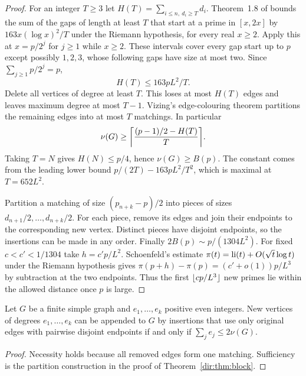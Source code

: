 \begin{proof}
For an integer $T\ge3$ let $H(T)=\sum_{i\le n,\ d_i\ge T}d_i$. Theorem~1.8 of
\cite{ErdosEtAl2024Sequence} bounds the sum of the gaps of length at least $T$ that
start at a prime in $[x,2x]$ by $163x(\log x)^2/T$ under the Riemann hypothesis, for
every real $x\ge2$. Apply this at $x=p/2^j$ for $j\ge1$ while $x\ge2$. These intervals
cover every gap start up to $p$ except possibly $1,2,3$, whose following gaps have size
at most two. Since $\sum_{j\ge1}p/2^j=p$,
\begin{equation}\label{dir:eq:g1}
 H(T)\le163pL^2/T .
\end{equation}
Delete all vertices of degree at least $T$. This loses at most $H(T)$ edges and leaves
maximum degree at most $T-1$. Vizing's edge-colouring theorem partitions the remaining
edges into at most $T$ matchings. In particular
\begin{equation}\label{dir:eq:g2}
 \nu(G)\ge\ceil*{\frac{(p-1)/2-H(T)}{T}} .
\end{equation}
Taking $T=N$ gives $H(N)\le p/4$, hence $\nu(G)\ge B(p)$. The constant comes from the
leading lower bound $p/(2T)-163pL^2/T^2$, which is maximal at $T=652L^2$.

Partition a matching of size $(p_{n+k}-p)/2$ into pieces of sizes
$d_{n+1}/2,\dots,d_{n+k}/2$. For each piece, remove its edges and join their endpoints
to the corresponding new vertex. Distinct pieces have disjoint endpoints, so the
insertions can be made in any order. Finally $2B(p)\sim p/(1304L^2)$. For fixed
$c<c'<1/1304$ take $h=c'p/L^2$. Schoenfeld's estimate
$\pi(t)=\operatorname{li}(t)+O(\sqrt t\log t)$ under the Riemann hypothesis
\cite[Corollary~1]{Schoenfeld1976Sharper} gives
$\pi(p+h)-\pi(p)=(c'+o(1))p/L^3$ by subtraction at the two endpoints. Thus the first
$\lfloor cp/L^3\rfloor$ new primes lie within the allowed distance once $p$ is large.
\end{proof}

\begin{proposition}\label{dir:prop:multiset}
Let $G$ be a finite simple graph and $e_1,\dots,e_k$ positive even integers. New
vertices of degrees $e_1,\dots,e_k$ can be appended to $G$ by insertions that use only
original edges with pairwise disjoint endpoints if and only if
$\sum_je_j\le2\nu(G)$.
\end{proposition}

\begin{proof}
Necessity holds because all removed edges form one matching. Sufficiency is the
partition construction in the proof of Theorem~\ref{dir:thm:block}.
\end{proof}

